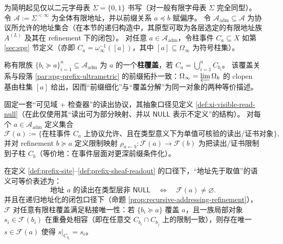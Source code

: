 \begin{definition}[前缀站点与柱覆盖]\label{def:prefix-site}
为简明起见仅以二元字母表 \(\Sigma=\{0,1\}\) 书写（对一般有限字母表 \(\Sigma\) 完全同型）。令 \(\mathcal{A}:=\Sigma^{<\infty}\) 为全体有限地址，并以前缀关系 \(a\preceq b\) 赋偏序。
令 \(\mathcal{A}_{\mathrm{adm}}\subseteq\mathcal{A}\) 为协议所允许的地址集合（在本节的递归构造中，其原型可取为各层选定的有限地址族 \(A^{(L)}\) 及其在 refinement 下的闭包）。
对任意 \(a\in\mathcal{A}_{\mathrm{adm}}\)，令柱事件 \(C_a\subseteq X\) 如第 \ref{sec:spg} 节定义（亦即 \(C_a=\omega_\infty^{-1}([a])\)，其中 \([a]\subseteq\Omega_\infty\) 为符号柱集）。
\par
称有限族 \(\{b_i\succeq a\}_{i=1}^n\subseteq\mathcal{A}_{\mathrm{adm}}\) 为 \(a\) 的一个\textbf{柱覆盖}，若 \(C_a=\bigcup_{i=1}^{n} C_{b_i}\)。
该覆盖关系与段落 \ref{par:spg-prefix-ultrametric} 的前缀拓扑一致：\(\Omega_\infty=\varprojlim \Omega_k\) 的 clopen 基由柱集 \([a]\) 给出，因而“前缀细化”与“覆盖分解”为同一对象的两种等价描述。
\end{definition}

\begin{definition}[协议可接受读出的（预）层]\label{def:prefix-sheaf-readout}
固定一套“可见域 + 检查器”的读出协议，其抽象口径见定义 \ref{def:xi-visible-read-null}（在此仅使用其“读出可为部分映射、并以 \(\mathsf{NULL}\) 表示不定义”的结构）。
对每个 \(a\in\mathcal{A}_{\mathrm{adm}}\) 定义集合
\[
\mathscr{F}(a):=\{\text{在柱事件 }C_a\text{ 上协议允许、且在类型意义下为单值可核验的读出/证书对象}\},
\]
并对 refinement \(b\succeq a\) 定义限制映射
\(\rho_{a\leftarrow b}:\mathscr{F}(a)\to\mathscr{F}(b)\)
为把读出/证书限制到子柱 \(C_b\)（等价地：在事件层面对更深前缀条件化）。
\end{definition}

\begin{proposition}\label{prop:null-as-local-section-obstruction}
在定义 \ref{def:prefix-site}--\ref{def:prefix-sheaf-readout} 的口径下，“地址先于取值”的语义可等价表述为：
\[
\text{地址 }a\text{ 的读出在类型层非 }\mathsf{NULL}
\quad\Longleftrightarrow\quad
\mathscr{F}(a)\neq\varnothing.
\]
并且在递归地址化的闭包口径下（命题 \ref{prop:recursive-addressing-refinement}），\(\mathscr{F}\) 对任意有限柱覆盖满足粘接唯一性：若 \(\{b_i\succeq a\}\) 覆盖 \(a\)，且一族局部对象 \(s_i\in\mathscr{F}(b_i)\) 在重叠处相容（即在任意交 \(C_{b_i}\cap C_{b_j}\) 上的限制一致），则存在唯一 \(s\in\mathscr{F}(a)\) 使得 \(s|_{C_{b_i}}=s_i\)。
\end{proposition}

